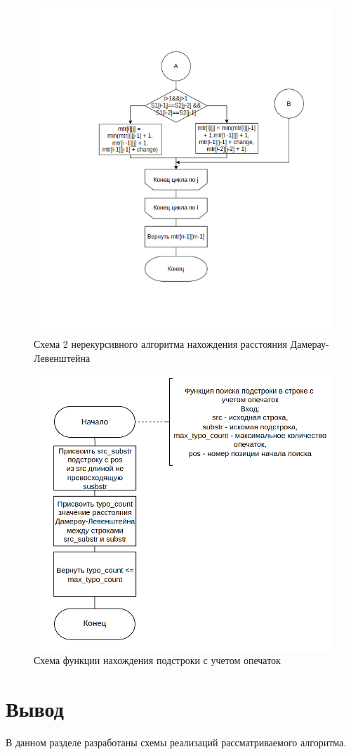 \begin{figure}[h]
	\centering
	\includegraphics[width=\textwidth]{img/dliter2.png}
	\caption{Схема 2 нерекурсивного алгоритма нахождения расстояния Дамерау-Левенштейна}
	\label{fig:DLiter2}
\end{figure}

\clearpage

\begin{figure}[h]
	\centering
	\includegraphics[width=\textwidth]{img/prefix.png}
	\caption{Схема функции нахождения подстроки с учетом опечаток}
	\label{fig:prefix}
\end{figure}

\clearpage

\section*{Вывод}

В данном разделе разработаны схемы реализаций рассматриваемого алгоритма.

